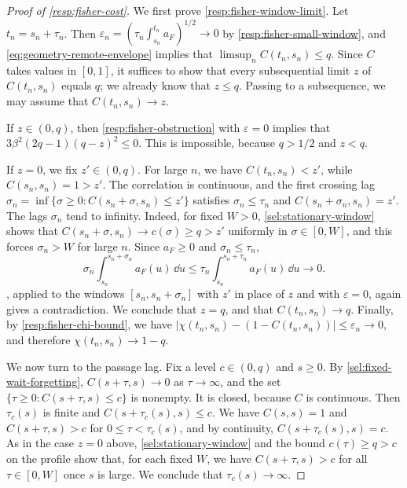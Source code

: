 \begin{proof}[Proof of \cref{resp:fisher-cost}]
We first prove \eqref{resp:fisher-window-limit}. Let $t_n=s_n+\tau_n$. Then $\varepsilon_n=(\tau_n\int_{s_n}^{t_n}a_F)^{1/2}\to0$ by \eqref{resp:fisher-small-window}, and \eqref{eq:geometry-remote-envelope} implies that $\limsup_nC(t_n,s_n)\le q$. Since $C$ takes values in $[0,1]$, it suffices to show that every subsequential limit $z$ of $C(t_n,s_n)$ equals $q$; we already know that $z\le q$. Passing to a subsequence, we may assume that $C(t_n,s_n)\to z$.

If $z\in(0,q)$, then \cref{resp:fisher-obstruction} with $\varepsilon=0$ implies that $3\beta^2(2q-1)(q-z)^2\le0$. This is impossible, because $q>1/2$ and $z<q$.

If $z=0$, we fix $z'\in(0,q)$. For large $n$, we have $C(t_n,s_n)<z'$, while $C(s_n,s_n)=1>z'$. The correlation is continuous, and the first crossing lag $\sigma_n=\inf\{\sigma\ge0:C(s_n+\sigma,s_n)\le z'\}$ satisfies $\sigma_n\le\tau_n$ and $C(s_n+\sigma_n,s_n)=z'$. The lags $\sigma_n$ tend to infinity. Indeed, for fixed $W>0$, \eqref{sel:stationary-window} shows that $C(s_n+\sigma,s_n)\to c(\sigma)\ge q>z'$ uniformly in $\sigma\in[0,W]$, and this forces $\sigma_n>W$ for large $n$. Since $a_F\ge0$ and $\sigma_n\le\tau_n$,
\[
 \sigma_n\int_{s_n}^{s_n+\sigma_n}a_F(u)\,\dd u\le\tau_n\int_{s_n}^{s_n+\tau_n}a_F(u)\,\dd u\longrightarrow0 .
\]
, applied to the windows $[s_n,s_n+\sigma_n]$ with $z'$ in place of $z$ and with $\varepsilon=0$, again gives a contradiction. We conclude that $z=q$, and that $C(t_n,s_n)\to q$. Finally, by \eqref{resp:fisher-chi-bound}, we have $|\chi(t_n,s_n)-(1-C(t_n,s_n))|\le\varepsilon_n\to0$, and therefore $\chi(t_n,s_n)\to1-q$.

We now turn to the passage lag. Fix a level $c\in(0,q)$ and $s\ge0$. By \cref{sel:fixed-wait-forgetting}, $C(s+\tau,s)\to0$ as $\tau\to\infty$, and the set $\{\tau\ge0:C(s+\tau,s)\le c\}$ is nonempty. It is closed, because $C$ is continuous. Then $\tau_c(s)$ is finite and $C(s+\tau_c(s),s)\le c$. We have $C(s,s)=1$ and $C(s+\tau,s)>c$ for $0\le\tau<\tau_c(s)$, and by continuity, $C(s+\tau_c(s),s)=c$. As in the case $z=0$ above, \eqref{sel:stationary-window} and the bound $c(\tau)\ge q>c$ on the profile show that, for each fixed $W$, we have $C(s+\tau,s)>c$ for all $\tau\in[0,W]$ once $s$ is large. We conclude that $\tau_c(s)\to\infty$.


\end{proof}
